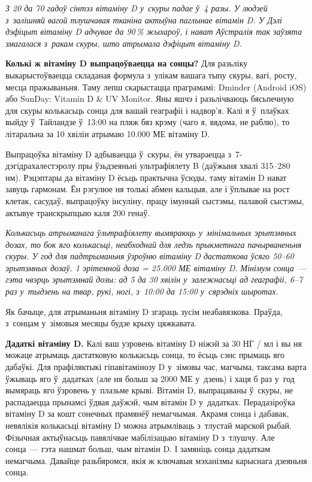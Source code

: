 \emph{З 20 да 70 гадоў сінтэз вітаміну D у~скуры падае ў~4 разы. У людзей з~залішняй вагой тлушчавая тканіна актыўна паглынае вітамін D. У Дэлі дэфіцыт вітаміну D адчувае да 90\,\% жыхароў, і нават Аўстралія так заўзята змагалася з~ракам скуры, што атрымала дэфіцыт вітаміну D.} 

\textbf{Колькі ж вітаміну D выпрацоўваецца на сонцы?} Для разьліку выкарыстоўваецца складаная формула з~улікам вашага тыпу скуры, вагі, росту, месца пражываньня. Таму лепш скарыстацца праграмамі: Dminder (Android iOS) або SunDay: Vitamin D \& UV Monitor. Яны яшчэ і разьлічваюць бясьпечную для скуры колькасьць сонца для вашай геаграфіі і надвор'я. Калі я ў~плаўках выйду ў~Тайландзе ў~13:00 на пляж бяз крэму (чаго я, вядома, не раблю), то літаральна за 10 хвілін атрымаю 10.000 МЕ вітаміну D. 


Выпрацоўка вітаміну D адбываецца ў~скуры, ён утвараецца з~7-дэгідрахалестэролу пры ўзьдзеяньні ультрафіялету B (даўжыня хвалі 315--280 нм). Рэцэптары да вітаміну D ёсьць практычна ўсюды, таму вітамін D нават завуць гармонам. Ён рэгулюе ня толькі абмен кальцыя, але і ўплывае на рост клетак, сасудаў, выпрацоўку інсуліну, працу імуннай сыстэмы, палавой сыстэмы, актывуе транскрыпцыю каля 200 генаў.

\emph{Колькасьць атрыманага ўльтрафіялету вымяраюць у~мінімальных эрытэмных дозах, то бок яго колькасьці, неабходнай для ледзь прыкметнага пачырваненьня скуры. У год для падтрыманьня ўзроўню вітаміну D дастаткова ўсяго 50--60 эрытэмных дозаў. 1 эрітемной доза = 25.000 МЕ вітаміну D. Мінімум сонца~--- гэта чвэрць эрытэмнай дозы: ад 5 да 30 хвілін у~залежнасьці ад геаграфіі, 6--7 раз у~тыдзень на твар, рукі, ногі, з~10:00 да 15:00 у~сярэдніх шыротах.}

Як бачыце, для атрыманьня вітаміну D згараць зусім неабавязкова. Праўда, з~сонцам у~зімовыя месяцы будзе крыху цяжкавата.

\textbf{Дадаткі вітаміну D.} Калі ваш узровень вітаміну D ніжэй за 30 НГ / мл і вы ня можаце атрымаць дастатковую колькасьць сонца, то ёсьць сэнс прымаць яго дабаўкі. Для прафіляктыкі гіпавітамінозу D у~зімовы час, магчыма, таксама варта ўжываць яго ў~дадатках (але ня больш за 2000 МЕ у~дзень) і хаця б раз у~год вымяраць яго ўзровень у~плазьме крыві. Вітамін D, выпрацаваны ў~скуры, не распадаецца прынамсі ўдвая даўжэй, чым вітамін D у~дадатках. Перадазіроўка вітаміну D за кошт сонечных прамянёў немагчымая. Акрамя сонца і дабавак, невялікія колькасьці вітаміну D можна атрымліваць з~тлустай марской рыбай. Фізычная актыўнасьць павялічвае мабілізацыю вітаміну D з~тлушчу. Але сонца~--- гэта нашмат больш, чым вітамін D. І замяніць сонца дадаткам немагчыма. Давайце разьбяромся, якія ж ключавыя мэханізмы карыснага дзеяньня сонца.

